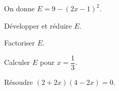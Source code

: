On donne $E = 9 - (2x - 1)^2$.
\begin{myenumerate}
\item Développer et réduire $E$.
\item Factoriser $E$.
\item Calculer $E$ pour $x = \dfrac13$.
\item Résoudre $(2 + 2x) (4 - 2x) = 0$.
\end{myenumerate}